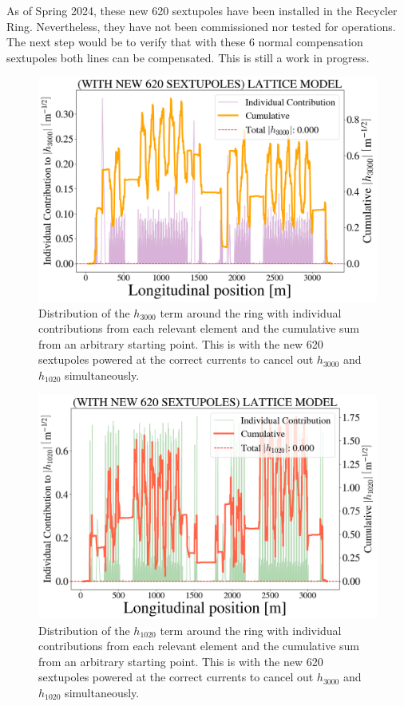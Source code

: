 As of Spring 2024, these new 620 sextupoles have been installed in the Recycler Ring. Nevertheless, they have not been commissioned nor tested for operations. The next step would be to verify that with these 6 normal compensation sextupoles both lines can be compensated. This is still a work in progress.

\begin{figure}[H]
    \centering
    \includegraphics[width=\columnwidth]{chapter4/new_sexts_h3000.png}
    \caption{Distribution of the $h_{3000}$ term around the ring with individual contributions from each relevant element and the cumulative sum from an arbitrary starting point. This is with the new 620 sextupoles powered at the correct currents to cancel out $h_{3000}$ and $h_{1020}$ simultaneously.}
    \label{fig:h3000newsexts}
\end{figure}

\begin{figure}[H]
    \centering
    \includegraphics[width=\columnwidth]{chapter4/new_sexts_h1020.png}
    \caption{Distribution of the $h_{1020}$ term around the ring with individual contributions from each relevant element and the cumulative sum from an arbitrary starting point. This is with the new 620 sextupoles powered at the correct currents to cancel out $h_{3000}$ and $h_{1020}$ simultaneously.}
    \label{fig:h1020newsexts}
\end{figure}

